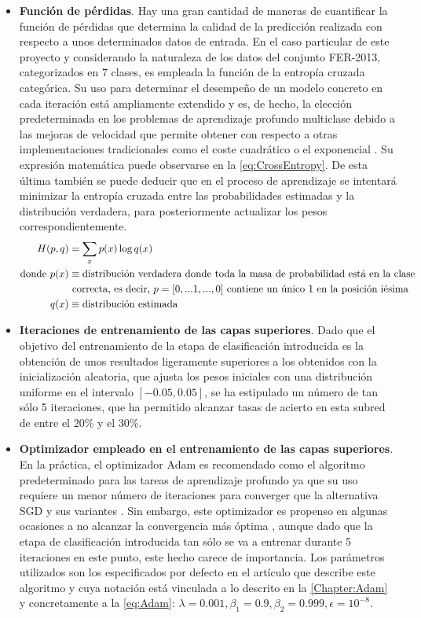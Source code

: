 \begin{itemize}
    \item \textbf{Función de pérdidas}. Hay una gran cantidad de maneras de cuantificar la función de pérdidas que determina la calidad de la predicción realizada con respecto a unos determinados datos de entrada. En el caso particular de este proyecto y considerando la naturaleza de los datos del conjunto FER-2013, categorizados en 7 clases, es empleada la función de la entropía cruzada categórica. Su uso para determinar el desempeño de un modelo concreto en cada iteración está ampliamente extendido y es, de hecho, la elección predeterminada en los problemas de aprendizaje profundo multiclase debido a las mejoras de velocidad que permite obtener con respecto a otras implementaciones tradicionales como el coste cuadrático o el exponencial \cite{CrossEntropy}. Su expresión matemática puede observarse en la \autoref{eq:CrossEntropy}. De esta última también se puede deducir que en el proceso de aprendizaje se intentará minimizar la entropía cruzada entre las probabilidades estimadas y la distribución verdadera, para posteriormente actualizar los pesos correspondientemente.
    \begin{align} \label{eq:CrossEntropy}
        H(p, q) &= \sum\limits_{x} p(x) \log q(x) \\
        \text{donde}~ 
            p(x) &\equiv \text{distribución verdadera donde toda la masa de probabilidad está en la clase} \notag \\
               & \text{ correcta, es decir, $p = [0, ... 1, ..., 0]$ contiene un único $1$ en la posición iésima} \notag \\
            q(x) & \equiv \text{distribución estimada} \notag
    \end{align}
    \item \textbf{Iteraciones de entrenamiento de las capas superiores}. Dado que el objetivo del entrenamiento de la etapa de clasificación introducida es la obtención de unos resultados ligeramente superiores a los obtenidos con la inicialización aleatoria, que ajusta los pesos iniciales con una distribución uniforme en el intervalo $[-0.05, 0.05]$, se ha estipulado un número de tan sólo 5 iteraciones, que ha permitido alcanzar tasas de acierto en esta subred de entre el 20\% y el 30\%.
    \item \textbf{Optimizador empleado en el entrenamiento de las capas superiores}. En la práctica, el optimizador Adam es recomendado como el algoritmo predeterminado para las tareas de aprendizaje profundo ya que su uso requiere un menor número de iteraciones para converger que la alternativa SGD y sus variantes \cite{CS231n}. Sin embargo, este optimizador es propenso en algunas ocasiones a no alcanzar la convergencia más óptima \cite{AdamToSDG}, aunque dado que la etapa de clasificación introducida tan sólo se va a entrenar durante 5 iteraciones en este punto, este hecho carece de importancia. Los parámetros utilizados son los especificados por defecto en el artículo que describe este algoritmo \cite{Adam} y cuya notación está vinculada a lo descrito en la \autoref{Chapter:Adam} y concretamente a la \autoref{eq:Adam}: $\lambda = 0.001, \beta_1 = 0.9, \beta_2 = 0.999, \epsilon = 10^{-8}$.

\end{itemize}
